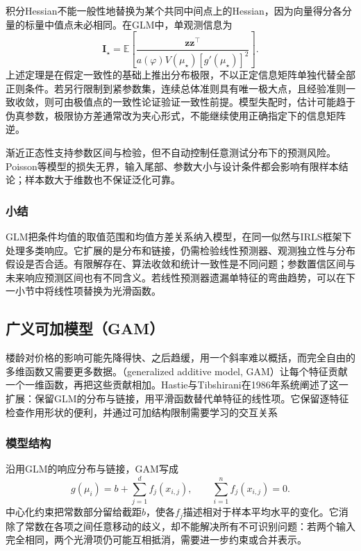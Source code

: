 积分Hessian不能一般性地替换为某个共同中间点上的Hessian，因为向量得分各分量的标量中值点未必相同。在GLM中，单观测信息为
\[
  \bm{I}_{\star}
  =\mathbb{E}\!\left[
    \frac{\bm{z}\bm{z}^{\top}}
      {a(\varphi)V(\mu_{\star})[g'(\mu_{\star})]^2}\right].
\]
上述定理是在假定一致性的基础上推出分布极限，不以正定信息矩阵单独代替全部正则条件。若另行限制到紧参数集，连续总体准则具有唯一极大点，且经验准则一致收敛，则可由极值点的一致性论证验证一致性前提。模型失配时，估计可能趋于伪真参数，极限协方差通常改为夹心形式，不能继续使用正确指定下的信息矩阵逆。

渐近正态性支持参数区间与检验，但不自动控制任意测试分布下的预测风险。Poisson等模型的损失无界，输入尾部、参数大小与设计条件都会影响有限样本结论；样本数大于维数也不保证泛化可靠。

\subsubsection{小结}

GLM把条件均值的取值范围和均值方差关系纳入模型，在同一似然与IRLS框架下处理多类响应。它扩展的是分布和链接，仍需检验线性预测器、观测独立性与分布假设是否合适。有限解存在、算法收敛和统计一致性是不同问题；参数置信区间与未来响应预测区间也有不同含义。若线性预测器遗漏单特征的弯曲趋势，可以在下一小节中将线性项替换为光滑函数。

\subsection{广义可加模型（GAM）}
\label{sec:regression-gam}

楼龄对价格的影响可能先降得快、之后趋缓，用一个斜率难以概括，而完全自由的多维函数又需要更多数据。（generalized additive model, GAM）让每个特征贡献一个一维函数，再把这些贡献相加。Hastie与Tibshirani在1986年系统阐述了这一扩展：保留GLM的分布与链接，用平滑函数替代单特征的线性项。它保留逐特征检查作用形状的便利，并通过可加结构限制需要学习的交互关系

\subsubsection{模型结构}

沿用GLM的响应分布与链接，GAM写成
\begin{equation}
  g(\mu_i)=b+\sum_{j=1}^{d}f_j(x_{i,j}),
  \qquad \sum_{i=1}^{n}f_j(x_{i,j})=0.
  \label{eq:regression-gam}
\end{equation}
中心化约束把常数部分留给截距$b$，使各$f_j$描述相对于样本平均水平的变化。它消除了常数在各项之间任意移动的歧义，却不能解决所有不可识别问题：若两个输入完全相同，两个光滑项仍可能互相抵消，需要进一步约束或合并表示。

